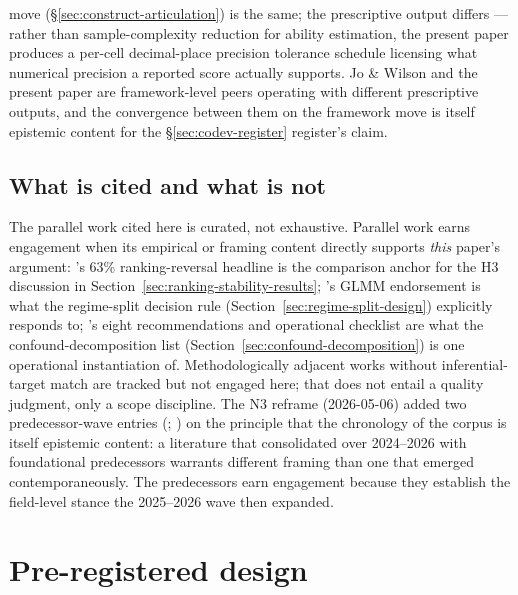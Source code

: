 \documentclass[11pt]{article}
\begin{document}
move (§\ref{sec:construct-articulation}) is the same; the prescriptive output differs --- rather than sample-complexity reduction for ability estimation, the present paper produces a per-cell decimal-place precision tolerance schedule licensing what numerical precision a reported score actually supports. Jo \& Wilson and the present paper are framework-level peers operating with different prescriptive outputs, and the convergence between them on the framework move is itself epistemic content for the §\ref{sec:codev-register} register's claim.

\subsection{What is cited and what is not}
\label{sec:cite-discipline}

The parallel work cited here is curated, not exhaustive. Parallel work earns engagement when its empirical or framing content directly supports \emph{this} paper's argument: \citet{romanou2026brittlebench}'s 63\% ranking-reversal headline is the comparison anchor for the H3 discussion in Section~\ref{sec:ranking-stability-results}; \citet{nist2026statmodels}'s GLMM endorsement is what the regime-split decision rule (Section~\ref{sec:regime-split-design}) explicitly responds to; \citet{bean2025measuring}'s eight recommendations and operational checklist are what the confound-decomposition list (Section~\ref{sec:confound-decomposition}) is one operational instantiation of. Methodologically adjacent works without inferential-target match are tracked but not engaged here; that does not entail a quality judgment, only a scope discipline. The N3 reframe (2026-05-06) added two predecessor-wave entries (\citealt{perlitz2024efficientbenchmarking}; \citealt{polo2024promptevalUniverso}) on the principle that the chronology of the corpus is itself epistemic content: a literature that consolidated over 2024--2026 with foundational predecessors warrants different framing than one that emerged contemporaneously. The predecessors earn engagement because they establish the field-level stance the 2025--2026 wave then expanded.


\section{Pre-registered design}
\label{sec:design}
\end{document}
